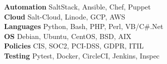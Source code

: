 
\textbf{Automation} SaltStack, Ansible, Chef, Puppet \\
\textbf{Cloud} Salt-Cloud, Linode, GCP, AWS \\
\textbf{Languages} Python, Bash, PHP, Perl, VB/C\#.Net \\
\textbf{OS} Debian, Ubuntu, CentOS, BSD, AIX \\
\textbf{Policies} CIS, SOC2, PCI-DSS, GDPR, ITIL \\
\textbf{Testing} Pytest, Docker, CircleCI, Jenkins, Inspec \\